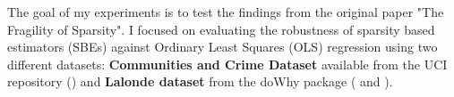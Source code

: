 The goal of my experiments is to test the findings from the original paper "The Fragility of Sparsity". I focused on evaluating the robustness of sparsity based estimators (SBEs) against Ordinary Least Squares (OLS) regression using two different datasets: \textbf{Communities and Crime Dataset} available from the UCI repository (\cite{misc_communities_and_crime_unnormalized_211}) and \textbf{Lalonde dataset} from the doWhy package (\cite{dowhy} and \cite{JMLR:v25:22-1258}).